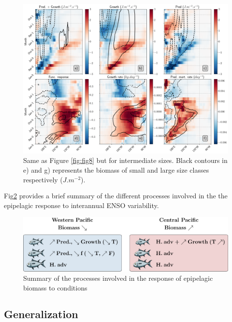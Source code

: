 \begin{figure}[h!tp]
	\centering
	\includegraphics[scale=0.4]{figs/fig9.png}	
	\caption{Same as Figure \ref{fig:fig8} but for intermediate sizes. Black contours in e) and g) represents the biomass of small and large size classes respectively ($J.m^{-2}$).}
	\label{fig:fig9}
\end{figure}

Fig\ref{fig:proc_summary} provides a brief summary of the different processes involved in the the epipelagic response to interannual ENSO variability.

\begin{figure}[h!tp]
	\centering
        \includegraphics[scale=0.6]{figs/conclusion/conlusion_fig.pdf}	
        \caption{Summary of the processes involved in the response of epipelagic biomass to \nino{} conditions}
	\label{fig:proc_summary}
\end{figure}



\subsection{Generalization}

